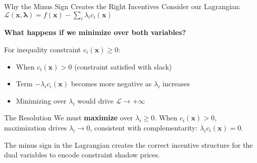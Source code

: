 \documentclass[aspectratio=1610]{beamer}
\begin{document}
\begin{frame}{Why the Minus Sign Creates the Right Incentives}
  Consider our Lagrangian: $\mathcal{L}(\mathbf{x}, \boldsymbol{\lambda}) = f(\mathbf{x}) - \sum_{i} \lambda_i c_i(\mathbf{x})$
  
  \vspace{0.3cm}
  \textbf{What happens if we minimize over both variables?}
  
  For inequality constraint $c_i(\mathbf{x}) \geq 0$:
  \begin{itemize}
    \item When $c_i(\mathbf{x}) > 0$ (constraint satisfied with slack)
    \item Term $-\lambda_i c_i(\mathbf{x})$ becomes more negative as $\lambda_i$ increases
    \item Minimizing over $\lambda_i$ would drive $\mathcal{L} \to +\infty$ 
  \end{itemize}
  
  \vspace{0.3cm}
  \begin{alertblock}{The Resolution}
    We must \textbf{maximize} over $\lambda_i \geq 0$. When $c_i(\mathbf{x}) > 0$, maximization drives $\lambda_i \to 0$, consistent with complementarity: $\lambda_i c_i(\mathbf{x}) = 0$.
  \end{alertblock}
  
  \vspace{0.3cm}
  The minus sign in the Lagrangian creates the correct incentive structure for the dual variables to encode constraint shadow prices.
\end{frame}
\end{document}
